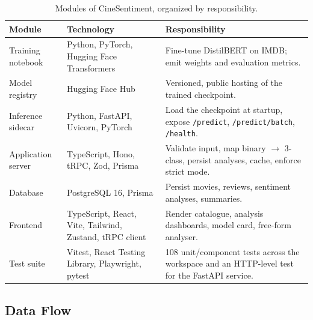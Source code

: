 \documentclass[11pt, a4paper]{article}
\begin{document}
\begin{table}[ht]
\centering
\small
\begin{tabular}{p{3.4cm} p{3.6cm} p{6.4cm}}
\toprule
\textbf{Module} & \textbf{Technology} & \textbf{Responsibility} \\
\midrule
Training notebook & Python, PyTorch, Hugging Face Transformers & Fine-tune DistilBERT on IMDB; emit weights and evaluation metrics. \\
Model registry & Hugging Face Hub & Versioned, public hosting of the trained checkpoint. \\
Inference sidecar & Python, FastAPI, Uvicorn, PyTorch & Load the checkpoint at startup, expose \texttt{/predict}, \texttt{/predict/batch}, \texttt{/health}. \\
Application server & TypeScript, Hono, tRPC, Zod, Prisma & Validate input, map binary $\rightarrow$ 3-class, persist analyses, cache, enforce strict mode. \\
Database & PostgreSQL 16, Prisma & Persist movies, reviews, sentiment analyses, summaries. \\
Frontend & TypeScript, React, Vite, Tailwind, Zustand, tRPC client & Render catalogue, analysis dashboards, model card, free-form analyser. \\
Test suite & Vitest, React Testing Library, Playwright, pytest & 108 unit/component tests across the workspace and an HTTP-level test for the FastAPI service. \\
\bottomrule
\end{tabular}
\caption{Modules of CineSentiment, organized by responsibility.}
\label{tab:modules}
\end{table}

\subsection{Data Flow}
\end{document}
